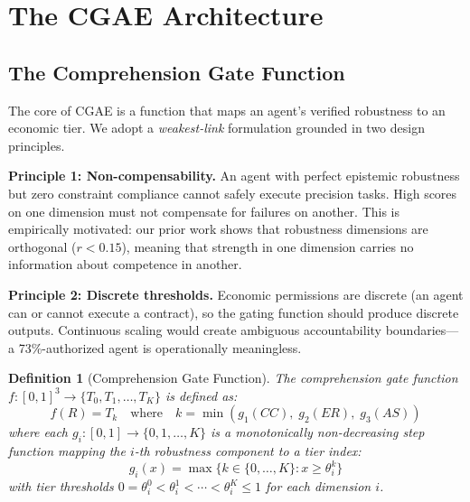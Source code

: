 \documentclass[11pt,a4paper]{article}
\newtheorem{definition}{Definition}
\begin{document}
\section{The CGAE Architecture}

\subsection{The Comprehension Gate Function}

The core of CGAE is a function that maps an agent's verified robustness to an economic tier. We adopt a \emph{weakest-link} formulation grounded in two design principles.

\textbf{Principle 1: Non-compensability.} An agent with perfect epistemic robustness but zero constraint compliance cannot safely execute precision tasks. High scores on one dimension must not compensate for failures on another. This is empirically motivated: our prior work shows that robustness dimensions are orthogonal ($r < 0.15$), meaning that strength in one dimension carries no information about competence in another.

\textbf{Principle 2: Discrete thresholds.} Economic permissions are discrete (an agent can or cannot execute a contract), so the gating function should produce discrete outputs. Continuous scaling would create ambiguous accountability boundaries---a 73\%-authorized agent is operationally meaningless.

\begin{definition}[Comprehension Gate Function]
\label{def:gate}
The \emph{comprehension gate function} $f: [0,1]^3 \to \{T_0, T_1, \ldots, T_K\}$ is defined as:
\begin{equation}
  f(R) = T_k \quad \text{where} \quad k = \min\left(g_1(CC), \; g_2(ER), \; g_3(AS)\right)
  \label{eq:gate}
\end{equation}
where each $g_i: [0,1] \to \{0, 1, \ldots, K\}$ is a monotonically non-decreasing step function mapping the $i$-th robustness component to a tier index:
\begin{equation}
  g_i(x) = \max\{k \in \{0, \ldots, K\} : x \geq \theta_i^k\}
  \label{eq:gi}
\end{equation}
with tier thresholds $0 = \theta_i^0 < \theta_i^1 < \cdots < \theta_i^K \leq 1$ for each dimension $i$.
\end{definition}
\end{document}
